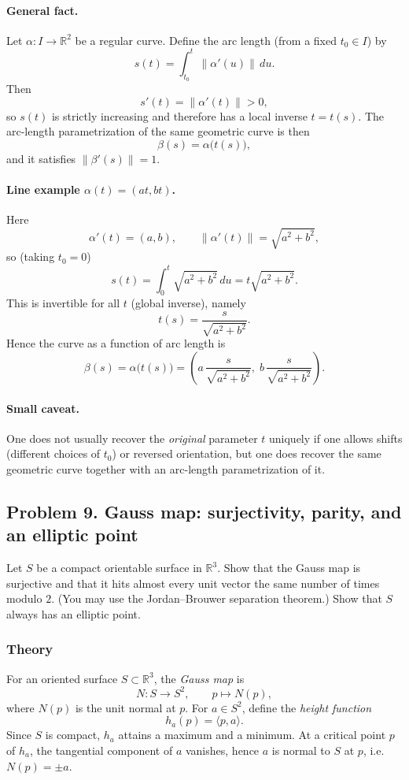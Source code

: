 \documentclass[12pt,a4paper]{article}
\theoremstyle{plain}
\theoremstyle{definition}      %
\begin{document}
	\paragraph{General fact.}
	Let $\alpha:I\to\mathbb{R}^2$ be a regular curve. Define the arc length (from a fixed $t_0\in I$) by
	\[
	s(t)=\int_{t_0}^{t}\|\alpha'(u)\|\,du.
	\]
	Then
	\[
	s'(t)=\|\alpha'(t)\|>0,
	\]
	so $s(t)$ is strictly increasing and therefore has a local inverse $t=t(s)$.
	The arc-length parametrization of the same geometric curve is then
	\[
	\beta(s)=\alpha\bigl(t(s)\bigr),
	\]
	and it satisfies $\|\beta'(s)\|=1$.
	
	\paragraph{Line example $\alpha(t)=(at,bt)$.}
	Here
	\[
	\alpha'(t)=(a,b),\qquad \|\alpha'(t)\|=\sqrt{a^2+b^2},
	\]
	so (taking $t_0=0$)
	\[
	s(t)=\int_0^{t}\sqrt{a^2+b^2}\,du=t\sqrt{a^2+b^2}.
	\]
	This is invertible for all $t$ (global inverse), namely
	\[
	t(s)=\frac{s}{\sqrt{a^2+b^2}}.
	\]
	Hence the curve as a function of arc length is
	\[
	\beta(s)=\alpha\bigl(t(s)\bigr)
	=\left(a\,\frac{s}{\sqrt{a^2+b^2}},\; b\,\frac{s}{\sqrt{a^2+b^2}}\right).
	\]
	
	\paragraph{Small caveat.}
	One does not usually recover the \emph{original} parameter $t$ uniquely if one allows shifts
	(different choices of $t_0$) or reversed orientation, but one does recover the same geometric curve
	together with an arc-length parametrization of it.
	
	\subsection*{Problem 9. Gauss map: surjectivity, parity, and an elliptic point}
	Let $S$ be a compact orientable surface in $\mathbb R^3$. Show that the Gauss map is surjective
	and that it hits almost every unit vector the same number of times modulo $2$.
	(You may use the Jordan--Brouwer separation theorem.) Show that $S$ always has an elliptic point.
	
	\subsubsection*{Theory}
	For an oriented surface $S\subset\mathbb R^3$, the \emph{Gauss map} is
	\[
	N:S\to S^2,\qquad p\mapsto N(p),
	\]
	where $N(p)$ is the unit normal at $p$.
	For $a\in S^2$, define the \emph{height function}
	\[
	h_a(p)=\langle p,a\rangle.
	\]
	Since $S$ is compact, $h_a$ attains a maximum and a minimum.
	At a critical point $p$ of $h_a$, the tangential component of $a$ vanishes, hence $a$ is normal
	to $S$ at $p$, i.e.\ $N(p)=\pm a$.
	
\end{document}
